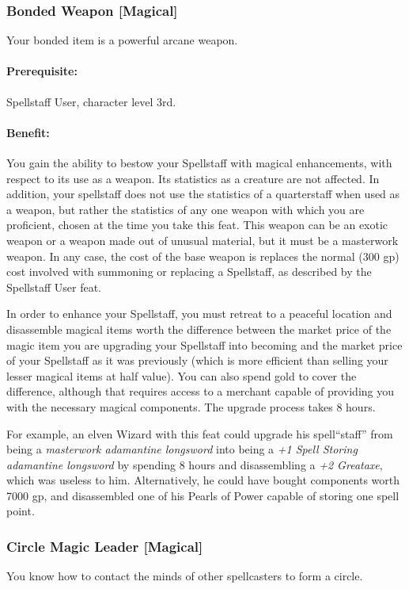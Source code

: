 \subsubsection[Bonded Weapon]{Bonded Weapon [Magical]}
\label{Feat:BondedWeapon}
Your bonded item is a powerful arcane weapon.
 
\paragraph{Prerequisite:} Spellstaff User, character level 3rd.
 
\paragraph{Benefit:} You gain the ability to bestow your Spellstaff with magical enhancements, with respect to its use as a weapon. Its statistics as a creature are not affected. 
In addition, your spellstaff does not use the statistics of a quarterstaff when used as a weapon, but rather the statistics of any one weapon with which you are proficient, chosen at the time you take this feat.
This weapon can be an exotic weapon or a weapon made out of unusual material, but it must be a masterwork weapon. 
In any case, the cost of the base weapon is replaces the normal (300 gp) cost involved with summoning or replacing a Spellstaff, as described by the Spellstaff User feat.

In order to enhance your Spellstaff, you must retreat to a peaceful location and disassemble magical items worth the difference between the market price of the magic item you are upgrading your Spellstaff into becoming and the market price of your Spellstaff as it was previously (which is more efficient than selling your lesser magical items at half value).
You can also spend gold to cover the difference, although that requires access to a merchant capable of providing you with the necessary magical components.
The upgrade process takes 8 hours.%

For example, an elven Wizard with this feat could upgrade his spell``staff'' from being a 
\emph{masterwork adamantine longsword} into being a \emph{+1 Spell Storing adamantine longsword} by spending 8 hours and %
disassembling a \emph{+2 Greataxe}, which was useless to him.
Alternatively, he could have bought components worth 7000 gp, and disassembled one of his Pearls of Power capable of storing one spell point.

\subsubsection[Circle Magic Leader]{Circle Magic Leader [Magical]}
\label{Feat:CircleMagicLeader}
You know how to contact the minds of other spellcasters to form a circle.
